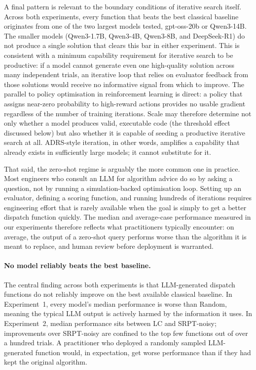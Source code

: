 \documentclass[11pt]{article}
\begin{document}
A final pattern is relevant to the boundary conditions of iterative
search itself.
Across both experiments, every function that beats the best
classical baseline originates from one of the two largest models
tested, gpt-oss-20b or Qwen3-14B.
The smaller models (Qwen3-1.7B, Qwen3-4B, Qwen3-8B, and
DeepSeek-R1) do not produce a single solution that clears this bar
in either experiment.
This is consistent with a minimum capability requirement for
iterative search to be productive: if a model cannot generate even
one high-quality solution across many independent trials,
an iterative loop that relies on evaluator feedback from those
solutions would receive no informative signal from which to improve.
The parallel to policy optimisation in reinforcement learning is
direct: a policy that assigns near-zero probability to high-reward
actions provides no usable gradient regardless of the number of
training iterations.
Scale may therefore determine not only whether a model produces
valid, executable code (the threshold effect discussed below) but
also whether it is capable of seeding a productive iterative search
at all.
ADRS-style iteration, in other words, amplifies a capability that
already exists in sufficiently large models; it cannot substitute
for it.

That said, the zero-shot regime is arguably the more common one in
practice.
Most engineers who consult an LLM for algorithm advice do so by
asking a question, not by running a simulation-backed optimisation
loop.
Setting up an evaluator, defining a scoring function, and running
hundreds of iterations requires engineering effort that is rarely
available when the goal is simply to get a better dispatch function
quickly.
The median and average-case performance measured in our experiments
therefore reflects what practitioners typically encounter: on
average, the output of a zero-shot query performs worse than the
algorithm it is meant to replace, and human review before deployment
is warranted.

\paragraph{No model reliably beats the best baseline.}
The central finding across both experiments is that LLM-generated
dispatch functions do not reliably improve on the best available
classical baseline.
In Experiment~1, every model's median performance is worse than
Random, meaning the typical LLM output is actively harmed by the
information it uses.
In Experiment~2, median performance sits between LC and SRPT-noisy;
improvements over SRPT-noisy are confined to the top few functions
out of over a hundred trials.
A practitioner who deployed a randomly sampled LLM-generated function
would, in expectation, get worse performance than if they had kept
the original algorithm.
\end{document}
